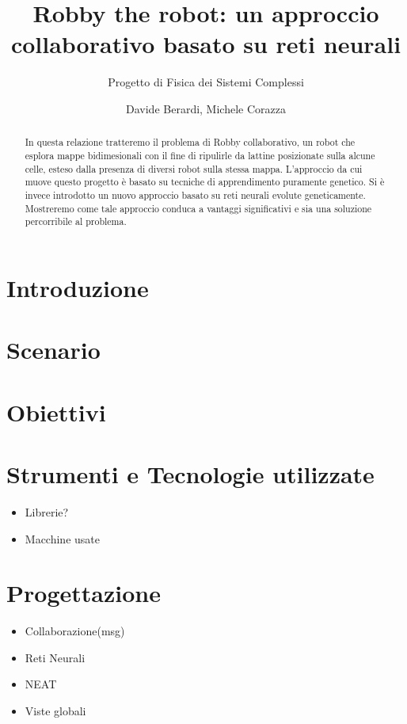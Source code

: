 \documentclass[a4paper,10pt,abstracton]{scrartcl}
\begin{document}
\title{Robby the robot: un approccio collaborativo basato su reti neurali}
\subtitle{Progetto di Fisica dei Sistemi Complessi}

\author{Davide Berardi, Michele Corazza}

\maketitle

\begin{abstract}
	In questa relazione tratteremo il problema di Robby collaborativo,
	un robot che esplora mappe bidimesionali con il fine di ripulirle da
	lattine posizionate sulla alcune celle, esteso dalla presenza di diversi
	robot sulla stessa mappa.
	L'approccio da cui muove questo progetto è basato su tecniche di
	apprendimento puramente genetico.
	Si è invece introdotto un nuovo approccio basato su reti neurali evolute
	geneticamente. Mostreremo come tale approccio conduca a vantaggi
	significativi e sia una soluzione percorribile al problema.
\end{abstract}

\section{Introduzione}


\section{Scenario}




\section {Obiettivi}



\section{Strumenti e Tecnologie utilizzate}
\begin{itemize}
 \item Librerie?
 \item Macchine usate
\end{itemize}



\section{Progettazione}
\begin{itemize}
 \item Collaborazione(msg)
 \item Reti Neurali
 \item NEAT
 \item Viste globali
\end{itemize}

\end{document}
